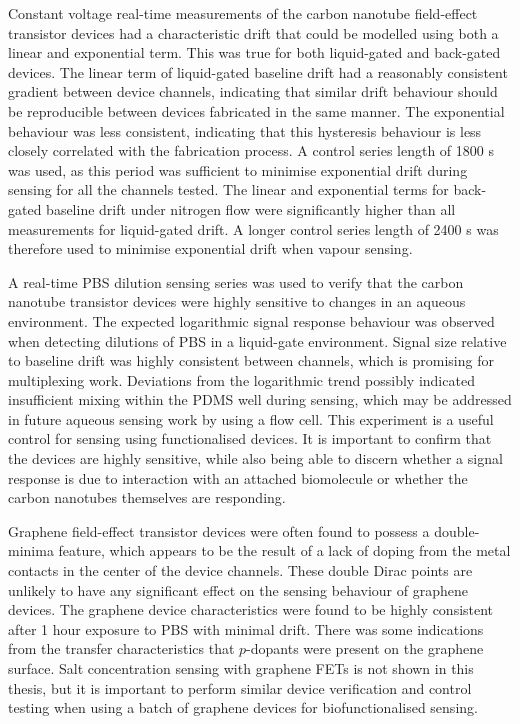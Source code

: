 \documentclass[
  a4paper,
]{scrbook}
\begin{document}
Constant voltage real-time measurements of the carbon nanotube
field-effect transistor devices had a characteristic drift that could be
modelled using both a linear and exponential term. This was true for
both liquid-gated and back-gated devices. The linear term of
liquid-gated baseline drift had a reasonably consistent gradient between
device channels, indicating that similar drift behaviour should be
reproducible between devices fabricated in the same manner. The
exponential behaviour was less consistent, indicating that this
hysteresis behaviour is less closely correlated with the fabrication
process. A control series length of 1800 s was used, as this period was
sufficient to minimise exponential drift during sensing for all the
channels tested. The linear and exponential terms for back-gated
baseline drift under nitrogen flow were significantly higher than all
measurements for liquid-gated drift. A longer control series length of
2400 s was therefore used to minimise exponential drift when vapour
sensing.

A real-time PBS dilution sensing series was used to verify that the
carbon nanotube transistor devices were highly sensitive to changes in
an aqueous environment. The expected logarithmic signal response
behaviour was observed when detecting dilutions of PBS in a liquid-gate
environment. Signal size relative to baseline drift was highly
consistent between channels, which is promising for multiplexing work.
Deviations from the logarithmic trend possibly indicated insufficient
mixing within the PDMS well during sensing, which may be addressed in
future aqueous sensing work by using a flow cell. This experiment is a
useful control for sensing using functionalised devices. It is important
to confirm that the devices are highly sensitive, while also being able
to discern whether a signal response is due to interaction with an
attached biomolecule or whether the carbon nanotubes themselves are
responding.

Graphene field-effect transistor devices were often found to possess a
double-minima feature, which appears to be the result of a lack of
doping from the metal contacts in the center of the device channels.
These double Dirac points are unlikely to have any significant effect on
the sensing behaviour of graphene devices. The graphene device
characteristics were found to be highly consistent after 1 hour exposure
to PBS with minimal drift. There was some indications from the transfer
characteristics that \(p\)-dopants were present on the graphene surface.
Salt concentration sensing with graphene FETs is not shown in this
thesis, but it is important to perform similar device verification and
control testing when using a batch of graphene devices for
biofunctionalised sensing.
\end{document}
